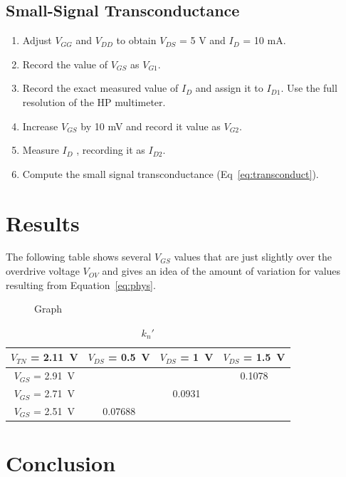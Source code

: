 \subsection{Small-Signal Transconductance}
\label{sec:nand}

\begin{enumerate}
\item Adjust $V_{GG}$ and $V_{DD}$ to obtain $V_{DS}$ = 5 V and $I_D$ = 10 mA.
\item Record the value of $V_{GS}$ as $V_{G1}$.
\item Record the exact measured value of $I_D$ and assign it to $I_{D1}$. Use the full resolution of the HP multimeter.
\item Increase $V_{GS}$ by 10 mV and record it value as $V_{G2}$.
\item Measure $I_D$ , recording it as $I_{D2}$.
\item Compute the small signal transconductance (Eq~\ref{eq:transconduct}).
\end{enumerate}

\section{Results}
\label{sec:results}

The following table shows several $V_{GS}$ values that are just slightly over the overdrive voltage $V_{OV}$ and gives an idea of the amount of variation for values resulting from Equation~\ref{eq:phys}.

\begin{figure}[hbtp]
  \centering
  \resizebox{1.0\textwidth}{!}{}
  \caption{\label{fig:graph} Graph}
\end{figure}

\begin{table}[hbtp]
  \centering
  \begin{tabular}{c|ccc}
    $V_{TN}$ = \SI{2.11}{V} & $V_{DS}$ = \SI{0.5}{V} & $V_{DS}$ = \SI{1}{V} & $V_{DS}$ = \SI{1.5}{V} \\
    \hline
    $V_{GS}$ = \SI{2.91}{V} & & & 0.1078 \\
    $V_{GS}$ = \SI{2.71}{V} & & 0.0931 & \\
    $V_{GS}$ = \SI{2.51}{V} & 0.07688 & & \\
  \end{tabular}
  \caption{\label{tab:kn} $k_n'$}
\end{table}

\section{Conclusion}
\label{sec:conclusion}


